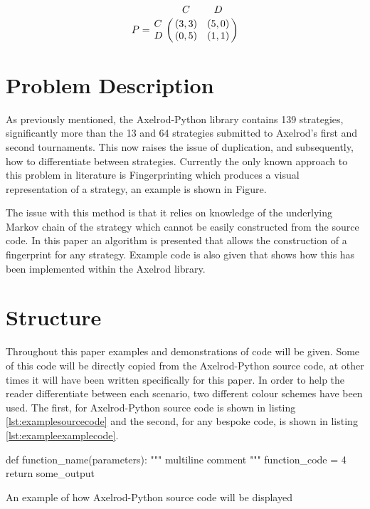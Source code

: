 \begin{equation}\label{eq:payoff_matrix}
%
P = \bordermatrix{~ & C & D \cr
                  C & (3, 3) & (5, 0) \cr
                  D & (0, 5) & (1, 1) \cr}
%
\end{equation}

\section{Problem Description}

As previously mentioned, the Axelrod-Python library contains 139 strategies, significantly more than the 13 and 64 strategies submitted to Axelrod's first and second tournaments.
This now raises the issue of duplication, and subsequently, how to differentiate between strategies.
Currently the only known approach to this problem in literature is Fingerprinting which produces a visual representation of a strategy, an example is shown in Figure. %

The issue with this method is that it relies on knowledge of the underlying Markov chain of the strategy which cannot be easily constructed from the source code.
In this paper an algorithm is presented that allows the construction of a fingerprint for any strategy.
Example code is also given that shows how this has been implemented within the Axelrod library.


\section{Structure}

Throughout this paper examples and demonstrations of code will be given.
Some of this code will be directly copied from the Axelrod-Python source code, at other times it will have been written specifically for this paper.
In order to help the reader differentiate between each scenario, two different colour schemes have been used.
The first, for Axelrod-Python source code is shown in listing \ref{lst:examplesourcecode} and the second, for any bespoke code, is shown in listing \ref{lst:exampleexamplecode}.

\begin{listing}[hbtp!]
\begin{SourceCode}
def function_name(parameters):
    """
    multiline comment
    """
    function_code = 4
    return some_output
\end{SourceCode}
\caption{An example of how Axelrod-Python source code will be displayed}
\label{lst:examplesourcecode}
\end{listing}

